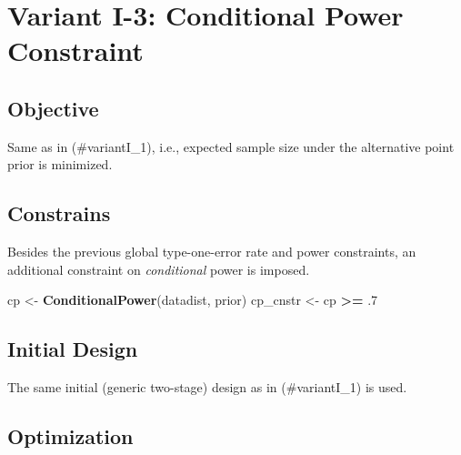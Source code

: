 \documentclass[]{book}
\newenvironment{Shaded}{\begin{snugshade}}{\end{snugshade}}
\newcommand{\CommentTok}[1]{\textcolor[rgb]{0.56,0.35,0.01}{\textit{#1}}}
\newcommand{\DataTypeTok}[1]{\textcolor[rgb]{0.13,0.29,0.53}{#1}}
\newcommand{\DecValTok}[1]{\textcolor[rgb]{0.00,0.00,0.81}{#1}}
\newcommand{\FloatTok}[1]{\textcolor[rgb]{0.00,0.00,0.81}{#1}}
\newcommand{\KeywordTok}[1]{\textcolor[rgb]{0.13,0.29,0.53}{\textbf{#1}}}
\newcommand{\NormalTok}[1]{#1}
\newcommand{\OperatorTok}[1]{\textcolor[rgb]{0.81,0.36,0.00}{\textbf{#1}}}
\newcommand{\StringTok}[1]{\textcolor[rgb]{0.31,0.60,0.02}{#1}}
\begin{document}
\hypertarget{variantI_3}{%
\section{Variant I-3: Conditional Power Constraint}\label{variantI_3}}

\hypertarget{objective-2}{%
\subsection{Objective}\label{objective-2}}

Same as in (\#variantI\_1), i.e., expected sample size under the
alternative point prior is minimized.

\hypertarget{constrains-2}{%
\subsection{Constrains}\label{constrains-2}}

Besides the previous global type-one-error rate and power constraints,
an additional constraint on \emph{conditional} power is imposed.

\begin{Shaded}
\begin{Highlighting}[]
\NormalTok{cp       <-}\StringTok{ }\KeywordTok{ConditionalPower}\NormalTok{(datadist, prior)}
\NormalTok{cp_cnstr <-}\StringTok{ }\NormalTok{cp }\OperatorTok{>=}\StringTok{ }\FloatTok{.7}
\end{Highlighting}
\end{Shaded}

\hypertarget{initial-design-1}{%
\subsection{Initial Design}\label{initial-design-1}}

The same initial (generic two-stage) design as in (\#variantI\_1) is used.

\hypertarget{optimization-2}{%
\subsection{Optimization}\label{optimization-2}}

\begin{Shaded}
\end{Shaded}
\end{document}
